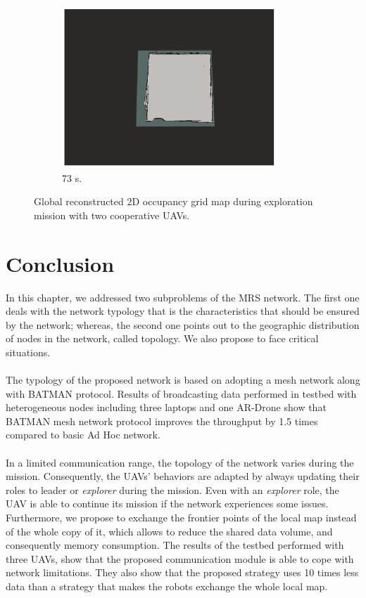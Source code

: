 \documentclass[11pt,openany]{book}
\begin{document}
\begin{figure}[H]
\begin{subfigure}[H]{0.3\linewidth}
        \includegraphics[width=\linewidth]{assets/4_12_i.png}
        \caption{{73 s.}}
        \label{fig:4.12i}
    \end{subfigure}
    \caption{{Global reconstructed 2D occupancy grid map during exploration mission with two cooperative UAVs.}}
    \label{fig:4.12}
\end{figure}
\section{Conclusion}
In this chapter, we addressed two subproblems of the MRS network. The first one deals with the network typology that is the characteristics that should be ensured by the network; whereas, the second one points out to the geographic distribution of nodes in the network, called topology. We also propose to face critical situations.\\\\
The typology of the proposed network is based on adopting a mesh network along with BATMAN protocol. Results of broadcasting data performed in testbed with heterogeneous nodes including three laptops and one AR-Drone show that BATMAN mesh network protocol improves the throughput by 1.5 times compared to basic Ad Hoc network.\\\\
In a limited communication range, the topology of the network varies during the mission. Consequently, the UAVs’ behaviors are adapted by always updating their roles to leader or \textit{explorer} during the mission. Even with an \textit{explorer} role, the UAV is able to continue its mission if the network experiences some issues. Furthermore, we propose to exchange the frontier points of the local map instead of the whole copy of it, which allows to reduce the shared data volume, and consequently memory consumption. The results of the testbed performed with three UAVs, show that the proposed communication module is able to cope with network limitations. They also show that the proposed strategy uses 10 times less data than a strategy that makes the robots exchange the whole local map.
\end{document}
